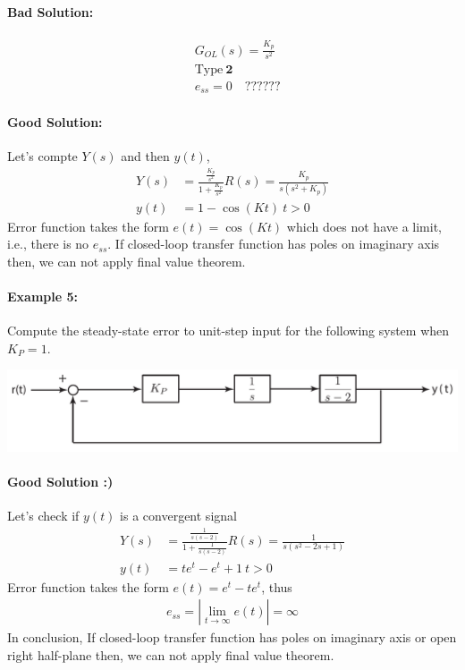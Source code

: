 \documentclass[twoside]{article}
\begin{document}
\paragraph{Bad Solution:}
%
\begin{align*}
&G_{OL}(s) =  \frac{K_p}{s^2} 
\\
&\mathrm{Type} \ \mathbf{2}  
\\
&e_{ss} = 0 \quad ??????
\end{align*}
%
\paragraph{Good Solution:}
%
Let's compte $Y(s)$ and then $y(t)$,
%
\begin{align*}
  Y(s) &= \frac{\frac{K_p}{s^2}}{1 + \frac{K_p}{s^2}} R(s) =
         \frac{K_p}{s (s^2 + K_p)} 
\\
 y(t) &= 1 - \cos (K t) \ t > 0
\end{align*}
%
Error function takes the form $e(t) = \cos (K t)$ which does not
have a limit, i.e., there is no $e_{ss}$. If closed-loop transfer
function has poles on imaginary axis then, we can not apply
final value theorem. 

\paragraph{Example 5:} Compute the steady-state error to unit-step input
for the following system when $K_P = 1$. 

\begin{center}
\begin{minipage}[h]{0.75\linewidth}
    \begin{center}
      \includegraphics[width=\textwidth]{unstable}
    \end{center}
\end{minipage}
\end{center}

\paragraph{Good Solution :)} Let's check if $y(t)$ is a convergent
signal
%
%
\begin{align*}
  Y(s) &= \frac{\frac{1}{s (s-2)}}{1 + \frac{1}{s (s-2)}} R(s) =
         \frac{1}{s (s^2 - 2s + 1) } 
\\
 y(t) &= t e^t - e^t + 1 \ t > 0
\end{align*}
%
Error function takes the form $e(t) = e^t - t e^t$, thus 
%
\begin{align*}
 e_{ss} = | \lim_{t \to \infty} e(t) | = \infty 
\end{align*}
%
In conclusion, If closed-loop transfer function has poles on imaginary
axis or open right half-plane then, we can not apply final value theorem. 
\end{document}
